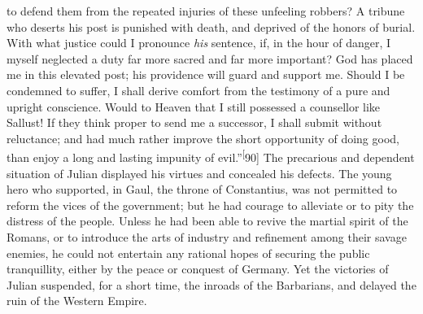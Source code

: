 to defend them from the repeated injuries of these unfeeling
robbers? A tribune who deserts his post is punished with death,
and deprived of the honors of burial. With what justice could I
pronounce \textit{his} sentence, if, in the hour of danger, I myself
neglected a duty far more sacred and far more important? God has
placed me in this elevated post; his providence will guard and
support me. Should I be condemned to suffer, I shall derive
comfort from the testimony of a pure and upright conscience.
Would to Heaven that I still possessed a counsellor like Sallust!
If they think proper to send me a successor, I shall submit
without reluctance; and had much rather improve the short
opportunity of doing good, than enjoy a long and lasting impunity
of evil.”\textsuperscript[90] The precarious and dependent situation of Julian
displayed his virtues and concealed his defects. The young hero
who supported, in Gaul, the throne of Constantius, was not
permitted to reform the vices of the government; but he had
courage to alleviate or to pity the distress of the people.
Unless he had been able to revive the martial spirit of the
Romans, or to introduce the arts of industry and refinement among
their savage enemies, he could not entertain any rational hopes
of securing the public tranquillity, either by the peace or
conquest of Germany. Yet the victories of Julian suspended, for a
short time, the inroads of the Barbarians, and delayed the ruin
of the Western Empire.



